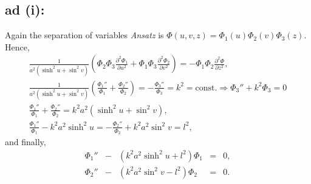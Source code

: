 {\begin{enumerate}
\end{enumerate}

\subsection*{ad (i):}
Again the separation of variables {\it Ansatz} is $\Phi(u,v,z)=\Phi_1(u)\Phi_2(v)\Phi_3(z)$.
Hence,
\begin{equation}
\begin{split}
  \frac{1}{a^2(\sinh^2u+\sin^2v)}
  \left(
    \Phi_2\Phi_3\frac{\partial^2\Phi_1}{\partial u^2}+
    \Phi_1\Phi_3\frac{\partial^2\Phi_2}{\partial v^2}
  \right)
  =-\Phi_1\Phi_2\frac{\partial^2\Phi}{\partial z^2},
\\
  \frac{1}{a^2(\sinh^2u+\sin^2v)}
  \left(
    \frac{\Phi_1''}{\Phi_1}+
    \frac{\Phi_2''}{\Phi_2}
  \right)=
  -\frac{\Phi_3''}{\Phi_3}=k^2=\mbox{const.}
  \Longrightarrow \Phi_3''+k^2\Phi_3=0
\\
  \frac{\Phi_1''}{\Phi_1}+
  \frac{\Phi_2''}{\Phi_2}=k^2a^2(\sinh^2u+\sin^2v),
\\
  \frac{\Phi_1''}{\Phi_1}-k^2a^2\sinh^2u=
  -\frac{\Phi_2''}{\Phi_2}+k^2a^2\sin^2v=l^2,
\end{split}
\end{equation}
and finally,
$$
  \begin{array}{rcccl}
    \Phi_1'' & - & (k^2a^2\sinh^2u+l^2)\Phi_1 & = & 0, \\
    \Phi_2'' & - & (k^2a^2\sin^2v-l^2)\Phi_2 & = & 0.
  \end{array}
$$


}
